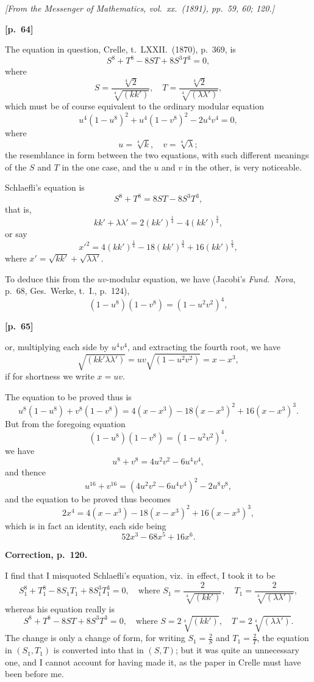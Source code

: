 \documentclass[11pt,a4paper]{article}
\theoremstyle{plain}
\begin{document}
\noindent\textit{[From the Messenger of Mathematics, vol.\ xx.\ (1891), pp.\ 59, 60; 120.]}

\vspace{0.5em}
\noindent\textbf{[p.\ 64]}

The equation in question, Crelle, t.\ LXXII.\ (1870), p.\ 369, is
$$
S^8 + T^8 - 8ST + 8S^3 T^3 = 0,
$$
where
$$
S = \frac{\sqrt[4]{2}}{\sqrt[4]{(kk')}}, \quad T = \frac{\sqrt[4]{2}}{\sqrt[4]{(\lambda\lambda')}},
$$
which must be of course equivalent to the ordinary modular equation
$$
u^4(1 - u^8)^2 + u^4(1 - v^8)^2 - 2u^4 v^4 = 0,
$$
where
$$
u = \sqrt[4]{k}, \quad v = \sqrt[4]{\lambda};
$$
the resemblance in form between the two equations, with such different meanings of the $S$ and $T$ in the one case, and the $u$ and $v$ in the other, is very noticeable.

Schlaefli's equation is
$$
S^8 + T^8 = 8ST - 8S^3 T^3,
$$
that is,
$$
kk' + \lambda\lambda' = 2(kk')^{\frac{1}{4}} - 4(kk')^{\frac{3}{4}},
$$
or say
$$
x'^2 = 4(kk')^{\frac{1}{4}} - 18(kk')^{\frac{3}{4}} + 16(kk')^{\frac{5}{4}},
$$
where $x' = \sqrt{kk'} + \sqrt{\lambda\lambda'}$.

To deduce this from the $uv$-modular equation, we have (Jacobi's \textit{Fund.\ Nova}, p.\ 68, Ges.\ Werke, t.\ I., p.\ 124),
$$
(1 - u^8)(1 - v^8) = (1 - u^2 v^2)^4,
$$

\vspace{0.5em}
\noindent\textbf{[p.\ 65]}

or, multiplying each side by $u^4 v^4$, and extracting the fourth root, we have
$$
\sqrt{(kk'\lambda\lambda')} = uv\sqrt{(1 - u^2 v^2)} = x - x^3,
$$
if for shortness we write $x = uv$.

The equation to be proved thus is
$$
u^8(1 - u^8) + v^8(1 - v^8) = 4(x - x^3) - 18(x - x^3)^2 + 16(x - x^3)^3.
$$
But from the foregoing equation
$$
(1 - u^8)(1 - v^8) = (1 - u^2 v^2)^4,
$$
we have
$$
u^8 + v^8 = 4u^2 v^2 - 6u^4 v^4,
$$
and thence
$$
u^{16} + v^{16} = (4u^2 v^2 - 6u^4 v^4)^2 - 2u^8 v^8,
$$
and the equation to be proved thus becomes
$$
2x^4 = 4(x - x^3) - 18(x - x^3)^2 + 16(x - x^3)^3,
$$
which is in fact an identity, each side being
$$
52x^3 - 68x^5 + 16x^6.
$$

\vspace{1em}
\noindent\textbf{Correction, p.\ 120.}

I find that I misquoted Schlaefli's equation, viz.\ in effect, I took it to be
$$
S_1^8 + T_1^8 - 8S_1 T_1 + 8S_1^3 T_1^3 = 0, \quad \text{where } S_1 = \frac{2}{\sqrt[4]{(kk')}}, \quad T_1 = \frac{2}{\sqrt[4]{(\lambda\lambda')}},
$$
whereas his equation really is
$$
S^8 + T^8 - 8ST + 8S^3 T^3 = 0, \quad \text{where } S = 2\sqrt[4]{(kk')}, \quad T = 2\sqrt[4]{(\lambda\lambda')}.
$$
The change is only a change of form, for writing $S_1 = \frac{2}{S}$ and $T_1 = \frac{2}{T}$, the equation in $(S_1, T_1)$ is converted into that in $(S, T)$; but it was quite an unnecessary one, and I cannot account for having made it, as the paper in Crelle must have been before me.
\end{document}

